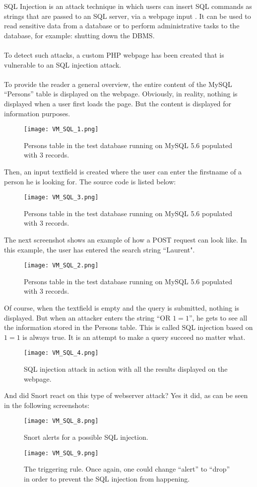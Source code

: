 SQL Injection is an attack technique in which users can insert SQL commands as strings that are passed to an SQL server, via a webpage input \citep{SQLInj}. It can be used to read sensitive data from a database or to perform administrative tasks to the database, for example: shutting down the DBMS. \\ \\
To detect such attacks, a custom PHP webpage has been created that is vulnerable to an SQL injection attack. \\ \\
To provide the reader a general overview, the entire content of the MySQL ``Persons'' table is displayed on the webpage. Obviously, in reality, nothing is displayed when a user first loads the page. But the content is displayed for information purposes.
\begin{figure}[h]
    \centering
    \texttt{[image: VM\_SQL\_1.png]}
    \caption{Persons table in the test database running on MySQL 5.6 populated with 3 records.}
\end{figure}
\clearpage
Then, an input textfield is created where the user can enter the firstname of a person he is looking for. The source code is listed below:
\begin{figure}[h]
    \centering
    \texttt{[image: VM\_SQL\_3.png]}
    \caption{Persons table in the test database running on MySQL 5.6 populated with 3 records.}
\end{figure}
The next screenshot shows an example of how a POST request can look like. In this example, the user has entered the search string ``Laurent".
\begin{figure}[h]
    \centering
    \texttt{[image: VM\_SQL\_2.png]}
    \caption{Persons table in the test database running on MySQL 5.6 populated with 3 records.}
\end{figure}
Of course, when the textfield is empty and the query is submitted, nothing is displayed. But when an attacker enters the string ``OR $1=1$'', he gets to see all the information stored in the Persons table. This is called SQL injection based on $1=1$ is always true. It is an attempt to make a query succeed no matter what.
\begin{figure}[h]
    \centering
    \texttt{[image: VM\_SQL\_4.png]}
    \caption{SQL injection attack in action with all the results displayed on the webpage.}
\end{figure}
And did Snort react on this type of webserver attack? Yes it did, as can be seen in the following screenshots:
\begin{figure}[h]
    \centering
    \texttt{[image: VM\_SQL\_8.png]}
    \caption{Snort alerts for a possible SQL injection.}
\end{figure}
\begin{figure}[h]
    \centering
    \texttt{[image: VM\_SQL\_9.png]}
    \caption{The triggering rule. Once again, one could change ``alert'' to ``drop'' in order to prevent the SQL injection from happening.}
\end{figure}

